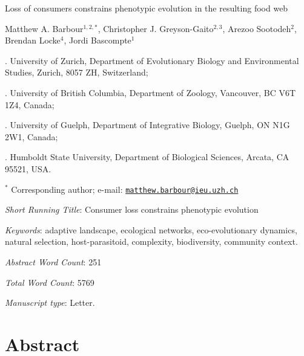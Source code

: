 \documentclass[11pt,]{article}
\title{}
\author{}
\date{}
\begin{document}
\vspace*{0.1cm}

\begin{center} \LARGE Loss of consumers constrains phenotypic evolution in the resulting food web \end{center}

\bigskip

\begin{center} \large Matthew A. Barbour$^{1,2,\ast}$, Christopher J. Greyson-Gaito$^{2,3}$, Arezoo Sootodeh$^{2}$, Brendan Locke$^{4}$, Jordi Bascompte$^{1}$ \normalsize \end{center}

\bigskip

. University of Zurich, Department of Evolutionary Biology
and Environmental Studies, Zurich, 8057 ZH, Switzerland;

. University of British Columbia, Department of Zoology,
Vancouver, BC V6T 1Z4, Canada;

. University of Guelph, Department of Integrative Biology,
Guelph, ON N1G 2W1, Canada;

. Humboldt State University, Department of Biological
Sciences, Arcata, CA 95521, USA.

\(^\ast\) Corresponding author; e-mail:
\href{mailto:matthew.barbour@ieu.uzh.ch}{\nolinkurl{matthew.barbour@ieu.uzh.ch}}

\bigskip

\emph{Short Running Title}: Consumer loss constrains phenotypic
evolution

\bigskip

\emph{Keywords}: adaptive landscape, ecological networks,
eco-evolutionary dynamics, natural selection, host-parasitoid,
complexity, biodiversity, community context.

\bigskip

\emph{Abstract Word Count}: 251

\bigskip

\emph{Total Word Count}: 5769

\bigskip

\emph{Manuscript type}: Letter.

\bigskip

\linenumbers{} \modulolinenumbers[3]

\newpage

\section{Abstract}\label{abstract}
\end{document}
